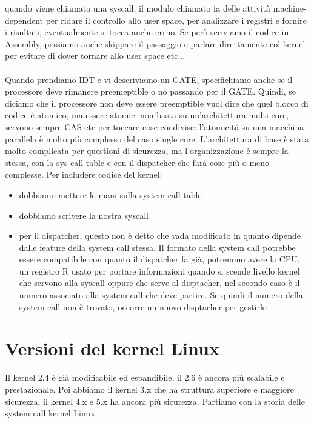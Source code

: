 \documentclass[12pt, oneside]{extbook}
\begin{document}
quando viene chiamata una syscall, il modulo chiamato fa delle attività machine-dependent per ridare il controllo allo user space, per analizzare i registri e fornire i risultati, eventualmente si tocca anche errno. Se però scriviamo il codice in Assembly, possiamo anche skippare il passaggio e parlare direttamente col kernel per evitare di dover tornare allo user space etc...\\\\ Quando prendiamo IDT e vi descriviamo un GATE, specifichiamo anche se il processore deve rimanere preemeptible o no passando per il GATE. Quindi, se diciamo che il processore non deve essere preemptible vuol dire che quel blocco di codice è atomico, ma essere atomici non basta su un'architettura multi-core, servono sempre CAS etc per toccare cose condivise: l'atomicità su una macchina parallela è molto più complesso del caso single core. L'architettura di base è stata molto complicata per questioni di sicurezza, ma l'organizzazione è sempre la stessa, con la sys call table e con il dispatcher che farà cose più o meno complesse. Per includere codice del kernel:
\begin{itemize}
\item dobbiamo mettere le mani sulla system call table
\item dobbiamo scrivere la nostra syscall
\item per il dispatcher, questo non è detto che vada modificato in quanto dipende dalle feature della system call stessa. Il formato della system call potrebbe essere compatibile con quanto il dispatcher fa già, potremmo avere la CPU, un registro R usato per portare informazioni quando si scende livello kernel che servono alla syscall oppure che serve al disptacher, nel secondo caso è il numero associato alla system call che deve partire. Se quindi il numero della system call non è trovato, occorre un nuovo disptacher per gestirlo
\end{itemize}
\section{Versioni del kernel Linux}
Il kernel 2.4 è già modificabile ed espandibile, il 2.6 è ancora più scalabile e prestazionale. Poi abbiamo il kernel 3.x che ha struttura superiore e maggiore sicurezza, il kernel 4.x e 5.x ha ancora più sicurezza. Partiamo con la storia delle system call kernel Linux
\end{document}
